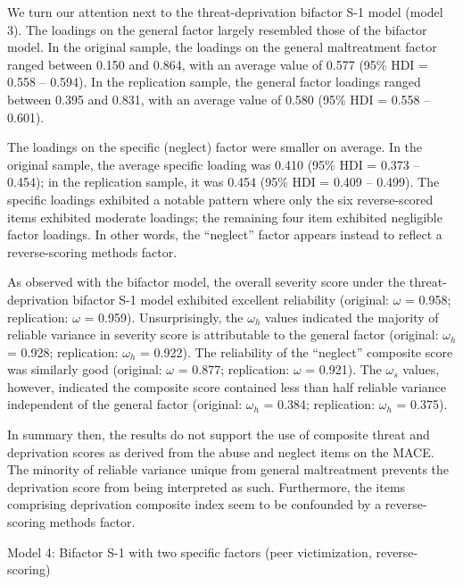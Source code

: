 \documentclass[letterpaper,man,natbib,floatsintext,longtable]{apa6}
\makeatletter
\renewcommand{\subsubsection}{\@startsection{subsubsection}{3}
  {\z@}%
  {\b@level@two@skip}{\e@level@two@skip}%
  {\normalfont\normalsize\bfseries}}
\makeatother
\begin{document}
We turn our attention next to the threat-deprivation bifactor S-1 model (model 3). The loadings on the general factor largely resembled those of the bifactor model. In the original sample, the loadings on the general maltreatment factor ranged between 0.150 and 0.864, with an average value of 0.577 (95\% HDI = 0.558 -- 0.594). In the replication sample, the general factor loadings ranged between 0.395 and 0.831, with an average value of 0.580 (95\% HDI = 0.558 -- 0.601). 

The loadings on the specific (neglect) factor were smaller on average. In the original sample, the average specific loading was 0.410 (95\% HDI = 0.373 -- 0.454); in the replication sample, it was 0.454 (95\% HDI = 0.409 -- 0.499). The specific loadings exhibited a notable pattern where only the six reverse-scored items exhibited moderate loadings; the remaining four item exhibited negligible factor loadings. In other words, the ``neglect'' factor appears instead to reflect a reverse-scoring methods factor.

As observed with the bifactor model, the overall severity score under the threat- deprivation bifactor S-1 model exhibited excellent reliability (original: $\omega$ = 0.958; replication: $\omega$ = 0.959). Unsurprisingly, the $\omega_h$ values indicated the majority of reliable variance in severity score is attributable to the general factor (original: $\omega_h$ = 0.928; replication: $\omega_h$ = 0.922). The reliability of the ``neglect'' composite score was similarly good (original: $\omega$ = 0.877; replication: $\omega$ = 0.921). The $\omega_s$ values, however, indicated the composite score contained less than half reliable variance independent of the general factor (original: $\omega_h$ = 0.384; replication: $\omega_h$ = 0.375). 

In summary then, the results do not support the use of composite threat and deprivation scores as derived from the abuse and neglect items on the MACE. The minority of reliable variance unique from general maltreatment prevents the deprivation score from being interpreted as such. Furthermore, the items comprising deprivation composite index seem to be confounded by a reverse-scoring methods factor.

\subsubsection{Model 4: Bifactor S-1 with two specific factors (peer victimization, reverse-scoring)}
\end{document}
